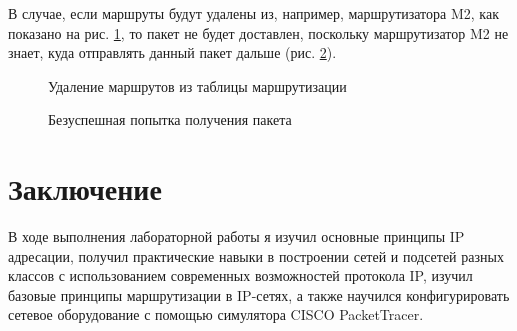 \documentclass[a4paper, 14pt]{extarticle}
\begin{document}
В случае, если маршруты будут удалены из, например, маршрутизатора M2, как
показано на рис. \ref{fig:visualization/unreachable/remove.png}, то пакет не
будет доставлен, поскольку маршрутизатор M2 не знает, куда отправлять данный
пакет дальше (рис. \ref{fig:visualization/unreachable/end.png}).

\begin{figure}[H]
  \centering
  \caption{Удаление маршрутов из таблицы маршрутизации}
  \label{fig:visualization/unreachable/remove.png}
\end{figure}

\begin{figure}[H]
  \centering
  \caption{Безуспешная попытка получения пакета}
  \label{fig:visualization/unreachable/end.png}
\end{figure}

\section{Заключение}

В ходе выполнения лабораторной работы я изучил основные принципы IP адресации,
получил практические навыки в построении сетей и подсетей разных классов с
использованием современных возможностей протокола IP, изучил базовые принципы
маршрутизации в IP-сетях, а также научился конфигурировать сетевое оборудование
с помощью симулятора CISCO PacketTracer.
\end{document}
